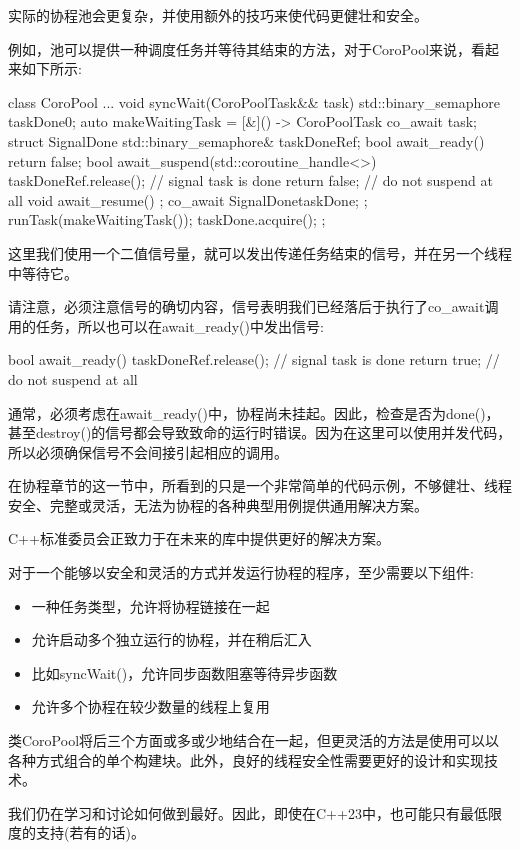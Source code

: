 
实际的协程池会更复杂，并使用额外的技巧来使代码更健壮和安全。

例如，池可以提供一种调度任务并等待其结束的方法，对于CoroPool来说，看起来如下所示:

\begin{cpp}
class CoroPool
{
	...
	void syncWait(CoroPoolTask&& task) {
		std::binary_semaphore taskDone{0};
		auto makeWaitingTask = [&]() -> CoroPoolTask {
			co_await task;
			struct SignalDone {
				std::binary_semaphore& taskDoneRef;
				bool await_ready() { return false; }
				bool await_suspend(std::coroutine_handle<>) {
					taskDoneRef.release(); // signal task is done
					return false; // do not suspend at all
				}
				void await_resume() { }
			};
			co_await SignalDone{taskDone};
		};
		runTask(makeWaitingTask());
		taskDone.acquire();
	}
};
\end{cpp}

这里我们使用一个二值信号量，就可以发出传递任务结束的信号，并在另一个线程中等待它。

请注意，必须注意信号的确切内容，信号表明我们已经落后于执行了co\_await调用的任务，所以也可以在await\_ready()中发出信号:

\begin{cpp}
bool await_ready() {
	taskDoneRef.release(); // signal task is done
	return true; // do not suspend at all
}
\end{cpp}

通常，必须考虑在await\_ready()中，协程尚未挂起。因此，检查是否为done()，甚至destroy()的信号都会导致致命的运行时错误。因为在这里可以使用并发代码，所以必须确保信号不会间接引起相应的调用。


在协程章节的这一节中，所看到的只是一个非常简单的代码示例，不够健壮、线程安全、完整或灵活，无法为协程的各种典型用例提供通用解决方案。

C++标准委员会正致力于在未来的库中提供更好的解决方案。

对于一个能够以安全和灵活的方式并发运行协程的程序，至少需要以下组件:

\begin{itemize}
\item 
一种任务类型，允许将协程链接在一起

\item 
允许启动多个独立运行的协程，并在稍后汇入

\item 
比如syncWait()，允许同步函数阻塞等待异步函数

\item 
允许多个协程在较少数量的线程上复用
\end{itemize}

类CoroPool将后三个方面或多或少地结合在一起，但更灵活的方法是使用可以以各种方式组合的单个构建块。此外，良好的线程安全性需要更好的设计和实现技术。

我们仍在学习和讨论如何做到最好。因此，即使在C++23中，也可能只有最低限度的支持(若有的话)。



